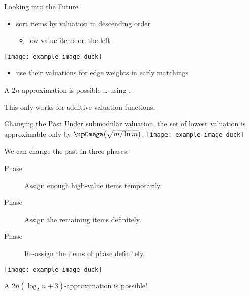 \begin{frame}{Looking into the Future}
	\begin{itemize}
		\item
		sort items by valuation in descending order
		\begin{itemize}
			\item
			low-value items on the left
		\end{itemize}
	\end{itemize}
	\begin{center}
		\texttt{[image: example-image-duck]}
	\end{center}
	\begin{itemize}
		\item
		use their valuations for edge weights in early matchings
	\end{itemize}
	\begin{exampleblock}{}
		A \(2n\)-approximation is possible \dots{} using \SMatch.
	\end{exampleblock}
	\begin{alertblock}{}
		This only works for additive valuation functions.
	\end{alertblock}
\end{frame}

\begin{frame}{Changing the Past}
	Under submodular valuation, the set of lowest valuation is approximable only by \(\bigomega\paren[\big]{ \sqrt{m/\ln m} }\).
	\texttt{[image: example-image-duck]}

	We can change the past in three phases:
	\begin{description}
		\item[Phase \phasei]
		Assign enough high-value items temporarily.

		\item[Phase \phaseii]
		Assign the remaining items definitely.

		\item[Phase \phaseiii]
		Re-assign the items of phase \phasei{} definitely.
	\end{description}
	\begin{center}
		\texttt{[image: example-image-duck]}
	\end{center}
	\begin{exampleblock}{}
		A \(2n (\log_2 n + 3)\)-approximation is possible!
	\end{exampleblock}
\end{frame}

